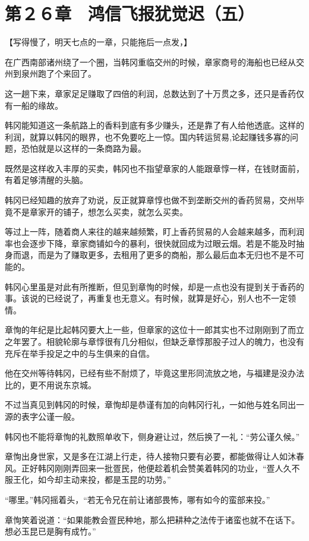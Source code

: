 \section{第２６章　鸿信飞报犹觉迟（五）}

【写得慢了，明天七点的一章，只能拖后一点发，】

在广西南部诸州绕了一个圈，当韩冈重临交州的时候，章家商号的海船也已经从交州到泉州跑了个来回了。

这一趟下来，章家足足赚取了四倍的利润，总数达到了十万贯之多，还只是香药仅有一船的缘故。

韩冈能知道这一条航路上的香料到底有多少赚头，还是靠了有人给他透底。这样的利润，就算以韩冈的眼界，也不免要吃上一惊。国内转运贸易,论起赚钱多寡的问题，恐怕就是以这样的一条商路为最。

既然是这样收入丰厚的买卖，韩冈也不指望章家的人能跟章惇一样，在钱财面前，有着足够清醒的头脑。

韩冈已经知趣的放弃了劝说，反正就算章惇也做不到垄断交州的香药贸易，交州毕竟不是章家开的铺子，想怎么买卖，就怎么买卖。

等过上一阵，随着商人来往的越来越频繁，盯上香药贸易的人会越来越多，而利润率也会逐步下降，章家商铺如今的暴利，很快就回成为过眼云烟。若是不能及时抽身而退，而是为了赚取更多，去租用了更多的商船，那么最后血本无归也不是不可能的。

韩冈心里虽是对此有所推断，但见到章恂的时候，却是一点也没有提到关于香药的事。该说的已经说了，再重复也无意义。有时候，就算是好心，别人也不一定领情。

章恂的年纪是比起韩冈要大上一些，但章家的这位十一郎其实也不过刚刚到了而立之年罢了。相貌轮廓与章惇很有几分相似，但缺乏章惇那股子过人的魄力，也没有充斥在举手投足之中的与生俱来的自信。

他在交州等待韩冈，已经有些不耐烦了，毕竟这里形同流放之地，与福建是没办法比的，更不用说东京城。

不过当真见到韩冈的时候，章恂却是恭谨有加的向韩冈行礼，一如他与姓名同出一源的表字公谨一般。

韩冈也不能将章恂的礼数照单收下，侧身避让过，然后换了一礼：“劳公谨久候。”

章恂出身世家，又是多在江湖上行走，待人接物只要有必要，都能做得让人如沐春风。正好韩冈刚刚弄回来一批疍民，他便趁着机会赞美着韩冈的功业，“疍人久不服王化，如今却主动来投，都是玉昆的功劳。”

“哪里。”韩冈摇着头，“若无令兄在前让诸部畏怖，哪有如今的蛮部来投。”

章恂笑着说道：“如果能教会疍民种地，那么把耕种之法传于诸蛮也就不在话下。想必玉昆已是胸有成竹。”


